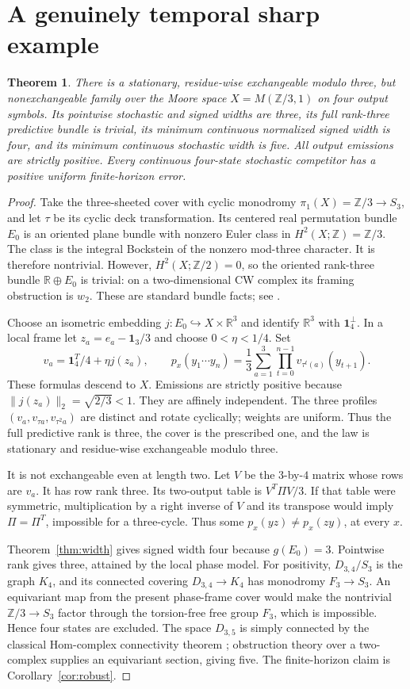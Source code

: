 \documentclass[11pt]{article}
\newtheorem{theorem}{Theorem}
\theoremstyle{remark}\newtheorem{remark}[theorem]{Remark}
\newcommand{\R}{\mathbb R}\newcommand{\one}{\mathbf1}
\begin{document}
\section{A genuinely temporal sharp example}
\begin{theorem}\label{thm:moore}
There is a stationary, residue-wise exchangeable modulo three, but nonexchangeable family over the Moore space $X=M(\mathbb Z/3,1)$ on four output symbols. Its pointwise stochastic and signed widths are three, its full rank-three predictive bundle is trivial, its minimum continuous normalized signed width is four, and its minimum continuous stochastic width is five. All output emissions are strictly positive. Every continuous four-state stochastic competitor has a positive uniform finite-horizon error.
\end{theorem}
\begin{proof}
Take the three-sheeted cover with cyclic monodromy $\pi_1(X)=\mathbb Z/3\to S_3$, and let $\tau$ be its cyclic deck transformation. Its centered real permutation bundle $E_0$ is an oriented plane bundle with nonzero Euler class in $H^2(X;\mathbb Z)=\mathbb Z/3$. The class is the integral Bockstein of the nonzero mod-three character. It is therefore nontrivial. However, $H^2(X;\mathbb Z/2)=0$, so the oriented rank-three bundle $\R\oplus E_0$ is trivial: on a two-dimensional CW complex its framing obstruction is $w_2$. These are standard bundle facts; see \cite{Hatcher}.

Choose an isometric embedding $j:E_0\hookrightarrow X\times\R^3$ and identify $\R^3$ with $\one_4^\perp$. In a local frame let $z_a=e_a-\one_3/3$ and choose $0<\eta<1/4$. Set
\[
v_a=\one_4^T/4+\eta j(z_a),\qquad
p_x(y_1\cdots y_n)=\frac13\sum_{a=1}^3\prod_{t=0}^{n-1}v_{\tau^t(a)}(y_{t+1}).
\]
These formulas descend to $X$. Emissions are strictly positive because $\|j(z_a)\|_2=\sqrt{2/3}<1$. They are affinely independent. The three profiles $(v_a,v_{\tau a},v_{\tau^2 a})$ are distinct and rotate cyclically; weights are uniform. Thus the full predictive rank is three, the cover is the prescribed one, and the law is stationary and residue-wise exchangeable modulo three.

It is not exchangeable even at length two. Let $V$ be the $3$-by-$4$ matrix whose rows are $v_a$. It has row rank three. Its two-output table is $V^T\Pi V/3$. If that table were symmetric, multiplication by a right inverse of $V$ and its transpose would imply $\Pi=\Pi^T$, impossible for a three-cycle. Thus some $p_x(yz)\ne p_x(zy)$, at every $x$.

Theorem~\ref{thm:width} gives signed width four because $g(E_0)=3$. Pointwise rank gives three, attained by the local phase model. For positivity, $D_{3,4}/S_3$ is the graph $K_4$, and its connected covering $D_{3,4}\to K_4$ has monodromy $F_3\to S_3$. An equivariant map from the present phase-frame cover would make the nontrivial $\mathbb Z/3\to S_3$ factor through the torsion-free free group $F_3$, which is impossible. Hence four states are excluded. The space $D_{3,5}$ is simply connected by the classical Hom-complex connectivity theorem \cite{BK,AGH}; obstruction theory over a two-complex supplies an equivariant section, giving five. The finite-horizon claim is Corollary~\ref{cor:robust}.
\end{proof}
\end{document}
